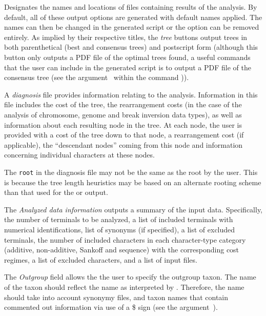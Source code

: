 \begin{description}
\setlength{\parindent}{0.5cm}	   
\item[Output Files]
Designates the names and locations of files containing results of the analysis. 
By default, all of these output options are generated with default names applied.  The names can 
then be changed in the generated script or the option can be removed entirely.  As implied by their 
respective titles, the \emph{tree} buttons output trees in both parenthetical (best and 
consensus trees) and postscript form (although this button only outputs a PDF file of the optimal trees
found, a useful commands that the user can include in the generated script is to output 
a PDF file of the consensus tree (see the argument~ 
within the command )). 

\indent A \emph{diagnosis} file provides information relating to the analysis. Information in this file includes 
the cost of the tree, the rearrangement costs (in the case of the analysis of chromosome, genome and 
break inversion data types), as well as information about each resulting node in the tree.  At each node, 
the user is provided with a cost of the tree down to that node, a rearrangement cost (if applicable), the ``descendant nodes'' 
coming from this node and information concerning individual characters at these nodes.

\begin{statement} The \texttt{root} in the diagnosis file may not be the same as the root  by the user.
This is because the tree length heuristics may be based on an alternate rooting scheme than that used for the 
 or  output.
\end{statement}

\indent The \emph{Analyzed data information} outputs a summary of the input data. Specifically, 
the number of terminals to be analyzed, a list of included terminals with numerical identifications, 
list of synonyms (if specified), a list of excluded terminals, the number of included characters in each 
character-type category (additive, non-additive, Sankoff and sequence) with the corresponding cost 
regimes, a list of excluded characters, and a list of input files.    

\indent The \emph{Outgroup} field allows the the user to specify the outgroup taxon.  The name of the taxon
should reflect the name as interpreted by \poy.  Therefore, the name should take into account synonymy files, 
and taxon names that contain commented out information via use of a \$ sign (see the argument~).
\end{description}

